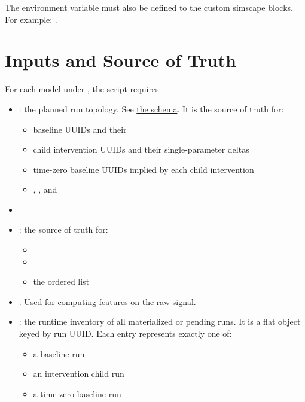 \documentclass[11pt]{article}
\begin{document}
The environment variable  must also be defined to the custom simscape blocks. For example: .
\section*{Inputs and Source of Truth}

For each model under , the script requires:
\begin{itemize}
\item {}: the planned run topology. See \hyperref[sec:model-run-specs-schema]{the  schema}. It is the source of truth for:
\begin{itemize}
  \item baseline UUIDs and their 
  \item child intervention UUIDs and their single-parameter deltas
  \item time-zero baseline UUIDs implied by each child intervention
  \item {}, , and 
\end{itemize}

\item {}
\item {}: the source of truth for:
  \begin{itemize}
  \item {}
  \item {}
  \item the ordered list 
  \end{itemize}
\item {}: Used for computing features on the raw signal.
\item {}\label{sec:model-record-json-schema}: the runtime inventory of all materialized or pending runs. It is a flat object keyed by run UUID\@. Each entry represents exactly one of:
  \begin{itemize}
  \item a baseline run
  \item an intervention child run
  \item a time-zero baseline run
  \end{itemize}



\end{itemize}
\end{document}
